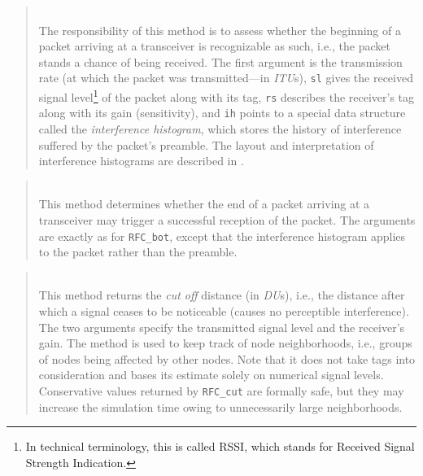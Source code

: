 \begin{quote}
\noindent{} \hspace{0in}\vspace{0.05in}\\
\noindent
The responsibility of
this method is to assess whether the beginning of a packet arriving at a
transceiver is recognizable as such, i.e., the packet stands a chance of
being received.
The first argument is the transmission rate (at which the packet was
transmitted---in {\em ITU\/}s), {\tt sl} gives the received signal
level\footnote{In technical terminology, this is called RSSI, which
stands for Received Signal Strength Indication.}
of the packet along with its tag,
{\tt rs} describes the receiver's tag along with its gain (sensitivity),
and {\tt ih} points to a special data structure called the {\em interference
histogram}, which stores the history of interference
suffered by the packet's preamble.
The layout and interpretation of interference histograms are described in
.
\end{quote}

\begin{quote}
\noindent{} \hspace{0in}\vspace{0.05in}\\
\noindent
This method determines whether the end of a packet arriving at a transceiver
may trigger a successful reception of the packet.
The arguments are exactly as for {\tt RFC\_bot}, except that the
interference histogram applies to the packet rather than the preamble.
\end{quote}

\begin{quote}
\noindent{} \hspace{0in}\vspace{0.05in}\\
\noindent
This method returns the {\em cut off\/} distance (in {\em DU\/}s), i.e., the
distance after which a signal ceases to be noticeable (causes no perceptible
interference).
The two arguments specify the transmitted signal level
and the receiver's gain.
The method is used to keep track of node neighborhoods, i.e., groups of nodes
being affected by other nodes.
Note that it does not take tags into consideration and bases its estimate
solely on numerical signal levels.
Conservative values returned by {\tt RFC\_cut} are formally
safe, but they may increase
the simulation time owing to unnecessarily large neighborhoods.

\end{quote}

